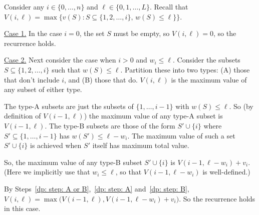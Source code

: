 \begin{longFormProof}%
  \step Consider any $i\in\{0,\ldots,n\}$ and $\ell\in\{0,1,\ldots,L\}$.
  \step Recall that $V(i, \ell) = \max\big\{ v(S) : S\subseteq \{1,2,\ldots,i\},\,w(S) \le \ell\}\big\}$.

  \smallskip 
  \begin{block}
    \step \underline{Case 1.} In the case $i=0$, the set $S$ must be empty, 
     so $V(i, \ell)=0$, so the recurrence holds.
  \end{block}


  \smallskip 
  \begin{block}
    \step \underline{Case 2.}  Next consider the case when $i>0$ and $w_i \le \ell$.
    \step Consider the subsets $S\subseteq \{1,2,\ldots,i\}$ such that $w(S) \le \ell$.
    \step Partition these into two types: (A) those that don't include $i$, and (B) those that do.
    \step\label{dp: step: A or B} $V(i, \ell)$ is the maximum value of any subset of either type.

    \smallskip 
    
    \step The type-A subsets are just the subsets of $\{1,\ldots,i-1\}$ with $w(S) \le \ell$.
    \step\label{dp: step: A}
    So (by definition of $V(i-1,\ell)$) the maximum value of any type-A subset is $V(i-1, \ell)$.
    \step The type-B subsets are those of the form $S'\cup \{i\}$
    where $S'\subseteq \{1,\ldots, i-1\}$ has $w(S') \le \ell - w_i$.
    \step The maximum value of such a set $S'\cup\{i\}$ is achieved when $S'$ itself has maximum total value.

    \smallskip 

    \step\label{dp: step: B} So, the maximum value of any type-B subset $S'\cup\{i\}$ is $V(i-1, \ell-w_i) + v_i$.
    \\(Here we implicitly use that $w_i \le \ell$, so that $V(i-1, \ell-w_i)$ is well-defined.)

    \smallskip 

    \step By Steps~\ref{dp: step: A or B},~\ref{dp: step: A} and~\ref{dp: step: B},
    $V(i, \ell) = \max\big(V(i-1, \ell), V(i-1, \ell-w_i) + v_i\big)$.
    \step So the recurrence holds in this case.
  \end{block}


\end{longFormProof}
